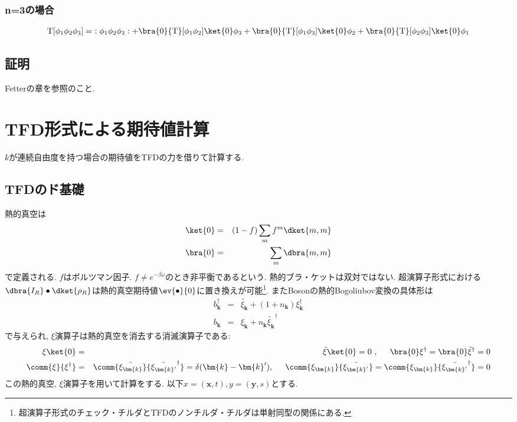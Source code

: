 \documentclass[10.5pt,a4paper]{jreport}
\begin{document}
\subsubsection{n=3の場合}
\begin{eqnarray}
  {\rm T}[\phi_1\phi_2\phi_3] =\ :\phi_1\phi_2\phi_3: + \bra{0}{\rm T}[\phi_1\phi_2]\ket{0}\phi_3 + \bra{0}{\rm T}[\phi_1\phi_3]\ket{0}\phi_2 + \bra{0}{\rm T}[\phi_2\phi_3]\ket{0}\phi_1 
\end{eqnarray}
\subsection{証明}
Fetterの章を参照のこと. 
\section{TFD形式による期待値計算}
$k$が連続自由度を持つ場合の期待値をTFDの力を借りて計算する.
\subsection{TFDのド基礎}
熱的真空は
\begin{eqnarray}
  \ket{0} &=& (1-f)\sum_mf^m\dket{m, m}\\
  \bra{0} &=& \sum_m\dbra{m, m}
\end{eqnarray}
で定義される. $f$はボルツマン因子. $f \neq e^{-\beta\omega}$のとき非平衡であるという. 熱的ブラ・ケットは双対ではない.
超演算子形式における$\dbra{I_R}\bullet\dket{\rho_R}$は熱的真空期待値$\ev{\bullet}{0}$に置き換えが可能\footnote{超演算子形式のチェック・チルダとTFDのノンチルダ・チルダは単射同型の関係にある. }. またBosonの熱的Bogoliubov変換の具体形は
\begin{eqnarray}
  b_{\bm{k}}^\dagger &=& \tilde{\xi_{\bm{k}}} + (1+n_{\bm{k}})\xi_{\bm{k}}^\dagger\\
  b_{\bm{k}} &=& \xi_{\bm{k}} + n_{\bm{k}}\tilde{\xi_{\bm{k}}}^\dagger
\end{eqnarray}
で与えられ, $\xi$演算子は熱的真空を消去する消滅演算子である:
\begin{eqnarray}
  \xi\ket{0} &=& \tilde{\xi}\ket{0} = 0\ ,\hspace{0.5cm} \bra{0}\xi^\dagger = \bra{0}\tilde{\xi}^\dagger = 0\\
  \comm{\xi}{\xi^\dagger} &=& \comm{\tilde{\xi_{\bm{k}}}}{\tilde{\xi_{\bm{k}'}}^\dagger} = \delta(\bm{k}-\bm{k}'), \hspace{0.5cm} \comm{\xi_{\bm{k}}}{\tilde{\xi_{\bm{k}'}}} = \comm{\xi_{\bm{k}}}{\tilde{\xi_{\bm{k}'}}^\dagger} = 0
\end{eqnarray}
この熱的真空, $\xi$演算子を用いて計算をする. 以下$x = (\bm{x}, t), y = (\bm{y}, s)$とする. 
\end{document}
